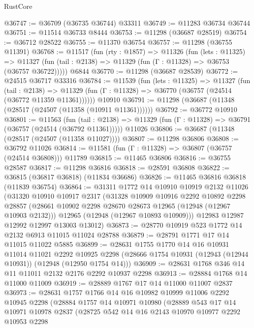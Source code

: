 \begin{lexlean}{RustCore}
\begin{coremodule}
@36747 := @36709 (@36735 @36744) @33311
@36749 := @11283 @36734 @36744
@36751 := @11514 @36733 @8444
@36753 := @11298 (@36687 @28519)
@36754 := @36712 @28522
@36755 := @11370 @36754
@36757 := @11298 (@36755 @11391)
@36768 := @11517
    (fun (rty : @1857) =>
    @11326
      (fun (lets : @11325) =>
      @11327 (fun (tail : @2138) => @11329 (fun (Γ : @11328) => @36753 (@36757 @36722)))))
    @6844
@36770 := @11298 (@36687 @28539)
@36772 := @24515 @36717 @33316
@36784 := @11539
    (fun (lets : @11325) =>
    @11327
      (fun (tail : @2138) =>
      @11329 (fun (Γ : @11328) => @36770 (@36757 (@24514 (@36772 @11359 @11361))))))
    @10910
@36791 := @11298 (@36687 (@11348 (@28517 (@24507 (@11358 (@10911 @11361))))))
@36792 := @36772 @10910
@36801 := @11563
    (fun (tail : @2138) => @11329 (fun (Γ : @11328) => @36791 (@36757 (@24514 (@36792 @11361)))))
    @11026
@36806 := @36687 (@11348 (@28517 (@24507 (@11358 @11027))))
@36807 := @11298 @36806
@36808 := @36792 @11026
@36814 := @11581 (fun (Γ : @11328) => @36807 (@36757 (@24514 @36808))) @11789
@36815 := @11465 @36806
@36816 := @36755 @28587
@36817 := @11298 @36816
@36818 := @28591 @36808
@36822 := @36815 (@36817 @36818) (@11834 @36686)
@36826 := @11465 @36816 @36818 (@11839 @36754)
@36864 := @31311
    @1772
    @14
    @10910
    @10919
    @2132
    @11026
    (@31320
      @10910
      @10917
      @2317
      (@31328
        @10909
        @10916
        @2292
        @10892
        @2298
        @28857
        (@28661 @10902 @2298 @28670 @28673 @12965 (@12948 (@12967 @10903 @2132)))
        @12965
        (@12948 (@12967 @10893 @10909)))
      @12983
      @12987
      @12992
      @12997
      @13003
      @13012)
@36873 := @28770 @10919 @523 @1772 @14 @2132 @6913 @11015 @11024 @28788
@36879 := @28791 @1771 @17 @14 @11015 @11022 @5885
@36899 := @28631
    @1755
    @1770
    @14
    @16
    @10931
    @11014
    @11021
    @2292
    @10925
    @2298
    (@28666 @1754 @10931 (@12943 (@12944 @10931)) (@12948 (@12950 @1754 @14)))
@36909 := @28631 @1768 @346 @14 @11 @11011 @2132 @2176 @2292 @10937 @2298
@36913 := @28884 @1768 @14 @11000 @11009
@36919 := @28889 @1767 @17 @14 @11000 @11007 @2837
@36973 := @28631
    @1757
    @1766
    @14
    @16
    @10982
    @10999
    @11006
    @2292
    @10945
    @2298
    (@28884
      @1757
      @14
      @10971
      @10980
      (@28889
        @543
        @17
        @14
        @10971
        @10978
        @2837
        (@28725
          @542
          @14
          @16
          @2143
          @10970
          @10977
          @2292
          @10953
          @2298

\end{coremodule}
\end{lexlean}
